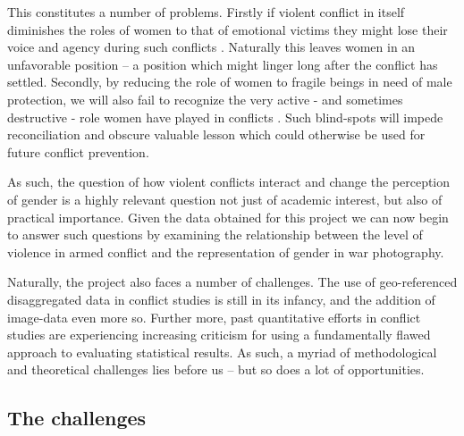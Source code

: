 \documentclass[a4paper]{article}
\begin{document}
This constitutes a number of problems. Firstly if violent conflict in itself diminishes the roles of women to that of emotional victims they might lose their voice and agency during such conflicts \citep{hansen2000gender, hansen2000little}. Naturally this leaves women in an unfavorable position \citep[294-297]{hansen2000little} -- a position which might linger long after the conflict has settled. Secondly, by reducing the role of women to fragile beings in need of male protection, we will also fail to recognize the very active - and sometimes destructive - role women have played in conflicts \citep[66]{hansen2000gender}. Such blind-spots will impede reconciliation and obscure valuable lesson which could otherwise be used for future conflict prevention.\par

As such, the question of how violent conflicts interact and change the perception of gender is a highly relevant question not just of academic interest, but also of practical importance. Given the data obtained for this project we can now begin to answer such questions by examining the relationship between the level of violence in armed conflict and the representation of gender in war photography.\par



Naturally, the project also faces a number of challenges. The use of geo-referenced disaggregated data in conflict studies is still in its infancy, and the addition of image-data even more so. Further more, past quantitative efforts in conflict studies are experiencing increasing criticism for using a fundamentally flawed approach to evaluating statistical results. As such, a myriad of methodological and theoretical challenges lies before us -- but so does a lot of opportunities.\par


\subsection{The challenges}
\end{document}
